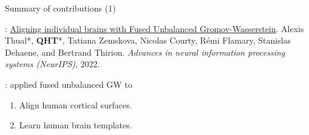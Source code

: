 \documentclass{beamer}
\begin{document}
\begin{frame}{Summary of contributions (1)}
  \scriptsize

  \vspace{-3cm}
  {}: \ul{Aligning individual brains with Fused Unbalanced Gromov-Wasserstein}.
  Alexis Thual*, \textbf{QHT}*, Tatiana Zemskova, Nicolas Courty,
  Rémi Flamary, Stanislas Dehaene, and Bertrand Thirion.
  \textit{Advances in neural information processing systems (NeurIPS)}, 2022.

  \vspace{0.3cm}
  {}: applied fused unbalanced GW to
  \begin{enumerate}
    \item Align human cortical surfaces.
    \item Learn human brain templates.
  \end{enumerate}


\end{frame}
\end{document}
